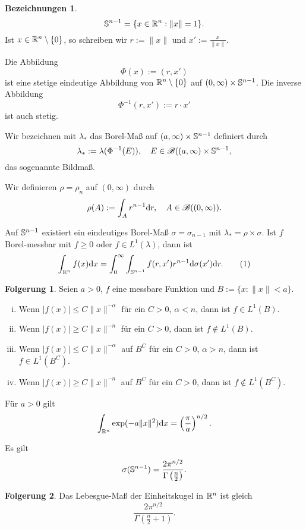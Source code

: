 \documentclass[
 a4paper,
 10pt,
 parskip=half
 ]{scrartcl}
\theoremstyle{plain}
\theoremstyle{definition}
\newtheorem*{folg}{Folgerung}
\newtheorem*{deno}{Bezeichnungen}
\numberwithin{equation}{section}
\begin{document}
\begin{deno}
  \[ \mathbb{S}^{n-1} = \{ x \in \mathbb{R}^n : \| x \| = 1 \}. \]
  Ist $x \in \mathbb{R}^n \setminus \{0\}$, so schreiben wir $r := \|x\|$ und $x' :=
  \frac{x}{\|x\|}$.

  Die Abbildung
  \[ \Phi(x) := (r,x') \]
  ist eine stetige eindeutige Abbildung von $\mathbb{R}^n\setminus\{0\}$ auf
  $(0,\infty) \times \mathbb{S}^{n-1}$. Die inverse Abbildung
  \[ \Phi^{-1}(r, x') := r \cdot x' \]
  ist auch stetig.

  Wir bezeichnen mit $\lambda_*$ das Borel-Maß auf $(a,\infty)
  \times \mathbb{S}^{n-1}$ definiert durch
  \[ \lambda_* := \lambda(\Phi^{-1}(E)), \quad E \in \mathscr{B}((a,\infty) \times
    \mathbb{S}^{n-1},\]
  das sogenannte Bildmaß.

  Wir definieren $\rho = \rho_n$ auf $(0,\infty)$ durch
  \[ \rho(A) := \int_A r^{n-1} \mathrm{d} r, \quad A \in \mathscr{B}((0,\infty)). \]
\end{deno}

\begin{thm}
  Auf $\mathbb{S}^{n-1}$ existiert ein eindeutiges Borel-Maß $\sigma = \sigma_{n-1}$
  mit $\lambda_* = \rho \times \sigma$. Ist $f$ Borel-messbar mit $f \ge 0$ oder
  $f \in L^1(\lambda)$, dann ist
  \[ \int_{\mathbb{R}^n} f(x) \mathrm{d} x =  \int_0^\infty \int_{\mathbb{S}^{n-1}}
    f(r,x') r^{n-1} \mathrm{d} \sigma(x') \mathrm{d} r. \tag{1} \]
\end{thm}

\begin{folg}
  Seien $a > 0$, $f$ eine messbare Funktion und $B := \{ x : \|x\|<a\}$.
  \begin{enumerate}[(i)]
    \item Wenn $|f(x)| \le C \|x\|^{-\alpha}$ für ein $C > 0$, $\alpha < n$, dann
      ist $f \in L^1(B)$.
    \item Wenn $|f(x)| \ge C \|x\|^{-n}$ für ein $C > 0$, dann ist $f \notin
      L^1(B)$.
    \item Wenn $|f(x)| \le C \|x\|^{-\alpha}$ auf $B^C$ für ein $C > 0$, $\alpha
      > n$, dann ist $f \in L^1(B^C)$.
    \item Wenn $|f(x)| \ge C \|x\|^{-n}$ auf $B^C$ für ein $C > 0$, dann ist $f
      \notin L^1(B^C)$.
  \end{enumerate}
\end{folg}  

\begin{lem}
  Für $a > 0$ gilt
  \[ \int_{\mathbb{R}^n} \exp(-a\|x\|^2) \mathrm{d} x = \left(  \frac{\pi}{a}
    \right)^{n/2}. \]
\end{lem}

\begin{lem}
  Es gilt
  \[ \sigma(\mathbb{S}^{n-1}) = \frac{2\pi^{n/2}}{\Gamma\left(  \frac{n}{2} \right)}. \]
\end{lem}

\begin{folg}
  Das Lebesgue-Maß der Einheitskugel in $\mathbb{R}^n$ ist gleich
  \[ \frac{2 \pi^{n/2}}{\Gamma\left(\frac{n}{2}+1\right)}.\]
\end{folg}
\end{document}

